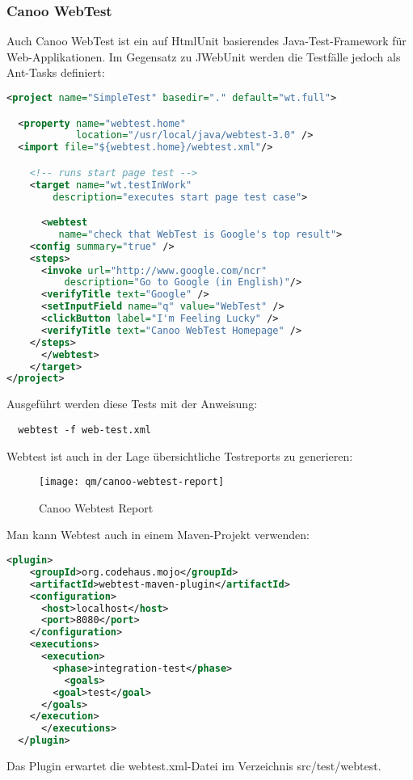 %
\subsubsection{Canoo WebTest}
Auch Canoo WebTest ist ein auf HtmlUnit basierendes
Java-Test-Framework für Web-Applikationen. Im Gegensatz zu JWebUnit
werden die Testfälle jedoch als Ant-Tasks definiert:
\begin{lstlisting}[language=xml,
  morekeywords={project,property,import,target,webtest,config,steps,invoke,verifyTitle,setInputField,clickButton,verifyTitle}]
<project name="SimpleTest" basedir="." default="wt.full">

  <property name="webtest.home"
            location="/usr/local/java/webtest-3.0" />
  <import file="${webtest.home}/webtest.xml"/>

    <!-- runs start page test -->
    <target name="wt.testInWork"
        description="executes start page test case">

      <webtest
         name="check that WebTest is Google's top result">
	<config summary="true" />
	<steps>
	  <invoke url="http://www.google.com/ncr"
		  description="Go to Google (in English)"/>
	  <verifyTitle text="Google" />
	  <setInputField name="q" value="WebTest" />
	  <clickButton label="I'm Feeling Lucky" />
	  <verifyTitle text="Canoo WebTest Homepage" />
	</steps>
      </webtest>
    </target>
</project>
\end{lstlisting}
Ausgeführt werden diese Tests mit der Anweisung:
\begin{lstlisting}
  webtest -f web-test.xml
\end{lstlisting}
Webtest ist auch in der Lage übersichtliche Testreports zu generieren:
\begin{figure}[H]
  \centering
  \texttt{[image: qm/canoo-webtest-report]}
  \caption{Canoo Webtest Report}
  \label{fig:canoo-webtest}
\end{figure}
Man kann Webtest auch in einem Maven-Projekt verwenden:
%
%
%
%
%
\begin{lstlisting}[language=xml,
  morekeywords={plugin,groupId,artifactId,configuration,host,port,haltonfailure,haltonerror,loglevel,executions,execution,phase,goals,goal}]
  <plugin>
    <groupId>org.codehaus.mojo</groupId>
    <artifactId>webtest-maven-plugin</artifactId>
    <configuration>
      <host>localhost</host>
      <port>8080</port>
    </configuration>
    <executions>
      <execution>
        <phase>integration-test</phase>
          <goals>
	    <goal>test</goal>
	  </goals>
	</execution>
      </executions>
  </plugin>
\end{lstlisting}
Das Plugin erwartet die webtest.xml-Datei im Verzeichnis
src/test/webtest.

